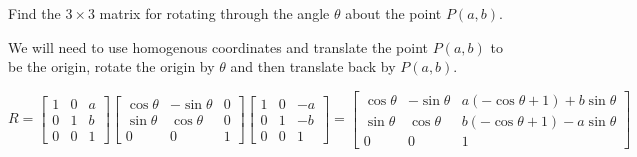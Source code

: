 \documentclass[../main.tex]{subfiles}
\begin{document}
Find the $3 \times 3$ matrix for rotating through the angle $\theta$ about the point $P(a, b)$.

\solution

We will need to use homogenous coordinates and translate the point $P(a,b)$ to be the origin, 
rotate the origin by $\theta$ and then translate back by $P(a,b)$. 

\[
    R = \begin{bmatrix}
            1 & 0 & a\\
            0 & 1 & b\\
            0 & 0 & 1
        \end{bmatrix}
        \begin{bmatrix}
            \cos \theta & - \sin \theta & 0\\
            \sin \theta & \cos \theta & 0\\
            0 & 0 & 1
        \end{bmatrix}
        \begin{bmatrix}
            1 & 0 & -a\\
            0 & 1 & -b\\
            0 & 0 & 1
        \end{bmatrix}
        =
        \begin{bmatrix}
            \cos \theta & -\sin\theta & a(-\cos\theta+1)+b\sin\theta\\
            \sin\theta & \cos\theta & b(-\cos\theta+1)-a\sin\theta\\
            0&0&1
        \end{bmatrix}
\]
\end{document}
